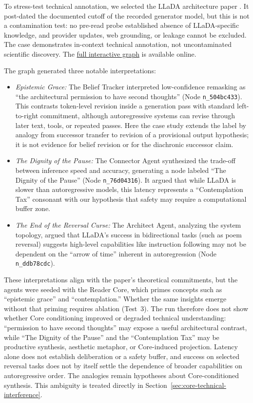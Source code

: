 To stress-test technical annotation, we selected the LLaDA architecture paper
\cite{nie2025llada}. It post-dated the documented cutoff of the recorded
generator model, but this is not a contamination test: no pre-read probe
established absence of LLaDA-specific knowledge, and provider updates, web
grounding, or leakage cannot be excluded. The case demonstrates in-context
technical annotation, not uncontaminated scientific discovery. The
\href{https://emergentwisdom.org/entangled-alignment/?project=llada}{full interactive graph}
is available online.

The graph generated three notable interpretations:

\begin{itemize}
    \item \emph{Epistemic Grace:} The Belief Tracker interpreted low-confidence
    remasking as ``the architectural permission to have second thoughts'' (Node
    \texttt{n\_504bc433}). This contrasts token-level revision inside a
    generation pass with standard left-to-right commitment, although
    autoregressive systems can revise through later text, tools, or repeated
    passes. Here the case study extends the label by analogy from successor
    transfer to revision of a provisional output hypothesis; it is not evidence
    for belief revision or for the diachronic successor claim.

    \item \emph{The Dignity of the Pause:} The Connector Agent synthesized the trade-off between inference speed and accuracy, generating a node labeled ``The Dignity of the Pause'' (Node \texttt{n\_76d04316}). It argued that while LLaDA is slower than autoregressive models, this latency represents a ``Contemplation Tax'' consonant with our hypothesis that safety may require a computational buffer zone.

    \item \emph{The End of the Reversal Curse:} The Architect Agent, analyzing the system topology, argued that LLaDA's success in bidirectional tasks (such as poem reversal) suggests high-level capabilities like instruction following may not be dependent on the ``arrow of time'' inherent in autoregression (Node \texttt{n\_ddb78cdc}).
\end{itemize}

These interpretations align with the paper's theoretical commitments, but the
agents were seeded with the Reader Core, which primes concepts such as
``epistemic grace'' and ``contemplation.'' Whether the same insights emerge
without that priming requires ablation (Test~3). The run therefore does not show
whether Core conditioning improved or degraded technical understanding:
``permission to have second thoughts'' may expose a useful architectural
contrast, while ``The Dignity of the Pause'' and the ``Contemplation Tax'' may
be productive synthesis, aesthetic metaphor, or Core-induced projection. Latency alone does not establish deliberation or a safety buffer, and success
on selected reversal tasks does not by itself settle the dependence of broader
capabilities on autoregressive order. The analogies remain hypotheses about Core-conditioned synthesis. This ambiguity is treated directly in
Section~\ref{sec:core-technical-interference}.

